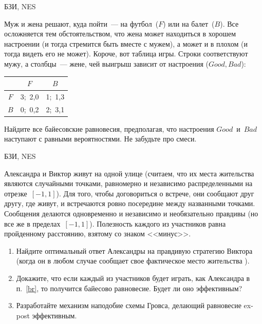 \begin{problem}
\begin{source}
БЗИ, NES
\end{source} Муж и жена решают, куда пойти~--- на
футбол~($F$) или на балет~($B$). Все осложняется тем
обстоятельством, что жена может находиться в хорошем
настроении (и тогда стремится быть вместе с мужем), а может
и в плохом (и тогда видеть его не может). Короче, вот
таблица игры. Строки соответствуют мужу, а столбцы~---
жене, чей выигрыш зависит от настроения ($Good,Bad$):
\begin{center}
\begin{tabular}{|c|cc|}
\hline &$F$&$B$\\ \hline $F$&3;\ 2,0&1;\ 1,3\\ $B$&0;\
0,2&2;\ 3,1\\ \hline
\end{tabular}
\end{center}

 Найдите все байесовские равновесия, предполагая, что
настроения $Good$~и~$Bad$ наступают с равными вероятностями. Не
забудьте про смеси.

\begin{sol}

\end{sol}
\end{problem}



\begin{problem}
\begin{source}
БЗИ, NES
\end{source}
 Александра и Виктор живут на
одной улице (считаем, что их места жительства являются
случайными точками, равномерно и независимо распределенными
на отрезке~$[-1,1]$). Для того, чтобы договориться о
встрече, они сообщают друг другу, где живут, и встречаются
ровно посередине между названными точками. Сообщения
делаются одновременно и независимо и необязательно правдивы
(но все же в пределах~$[-1,1]$). Полезность каждого из
участников равна пройденному расстоянию, взятому со знаком
<<минус>>.
\begin{enumerate}
 \item\label{br} Найдите оптимальный ответ Александры на правдивую
стратегию Виктора (когда он в любом случае сообщает свое
фактическое место жительства ).
 \item Докажите, что если каждый из участников будет играть, как Александра
в п.~\ref{br}, то получится байесово равновесие. Будет ли
оно эффективным?
 \item Разработайте механизм наподобие схемы Гровса, делающий
равновесие ex-post эффективным.
\end{enumerate}






\begin{sol}

\end{sol}
\end{problem}





